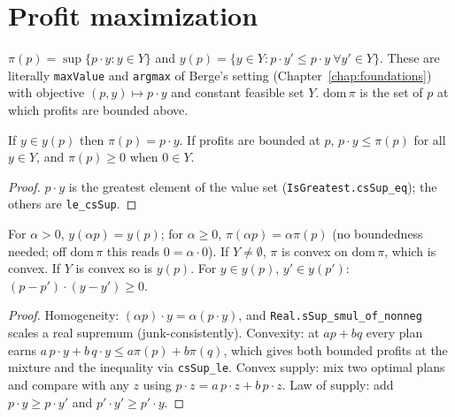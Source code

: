 \section{Profit maximization}
\label{sec:profit}

\begin{definition}
\label{def:profit}
\leanok
{}
$\pi(p) = \sup\{p \cdot y : y \in Y\}$ and $y(p) = \{y \in Y : p\cdot y' \le p \cdot y\ \forall y' \in Y\}$.
These are literally \texttt{maxValue} and \texttt{argmax} of Berge's setting
(Chapter~\ref{chap:foundations}) with objective $(p,y)\mapsto p\cdot y$ and constant feasible set $Y$.
$\mathrm{dom}\,\pi$ is the set of $p$ at which profits are bounded above.
\end{definition}

\begin{lemma}
\label{lem:profit-values}
\leanok
{}
If $y \in y(p)$ then $\pi(p) = p \cdot y$. If profits are bounded at $p$, $p\cdot y \le \pi(p)$ for all
$y \in Y$, and $\pi(p) \ge 0$ when $0 \in Y$.
\end{lemma}
\begin{proof}
\leanok
$p\cdot y$ is the greatest element of the value set (\texttt{IsGreatest.csSup\_eq}); the others
are \texttt{le\_csSup}.
\end{proof}

\begin{proposition}
\label{prop:profit-props}
\leanok
{}
For $\alpha > 0$, $y(\alpha p) = y(p)$; for $\alpha \ge 0$, $\pi(\alpha p) = \alpha \pi(p)$ (no
boundedness needed; off $\mathrm{dom}\,\pi$ this reads $0 = \alpha\cdot 0$). If $Y \neq \emptyset$,
$\pi$ is convex on $\mathrm{dom}\,\pi$, which is convex. If $Y$ is convex so is $y(p)$. For
$y \in y(p)$, $y' \in y(p')$: $(p - p')\cdot(y - y') \ge 0$.
\end{proposition}
\begin{proof}
\leanok
Homogeneity: $(\alpha p)\cdot y = \alpha (p\cdot y)$, and \texttt{Real.sSup\_smul\_of\_nonneg}
scales a real supremum (junk-consistently). Convexity: at $ap + bq$ every plan earns
$a\, p\cdot y + b\, q \cdot y \le a\pi(p) + b\pi(q)$, which gives both bounded profits at the
mixture and the inequality via \texttt{csSup\_le}. Convex supply: mix two optimal plans and
compare with any $z$ using $p\cdot z = a\, p \cdot z + b\, p\cdot z$. Law of supply: add
$p\cdot y \ge p \cdot y'$ and $p'\cdot y' \ge p'\cdot y$.
\end{proof}

